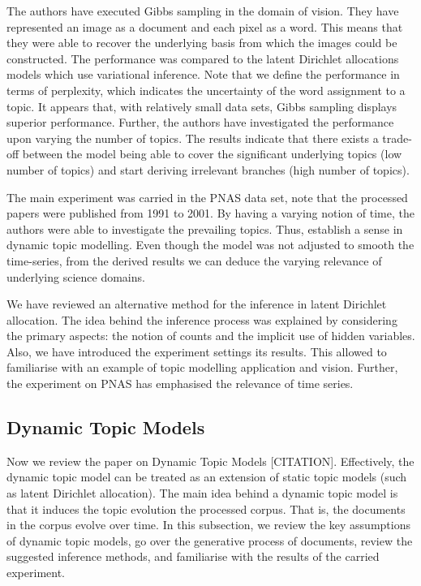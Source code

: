 \documentclass{mprop}
\begin{document}
\par The authors have executed Gibbs sampling in the domain of vision. They have represented an image as a document and each pixel as a word. This means that they were able to recover the underlying basis from which the images could be constructed. The performance was compared to the latent Dirichlet allocations models which use variational inference. Note that we define the performance in terms of perplexity, which indicates the uncertainty of the word assignment to a topic. It appears that, with relatively small data sets, Gibbs sampling displays superior performance. Further, the authors have investigated the performance upon varying the number of topics. The results indicate that there exists a trade-off between the model being able to cover the significant underlying topics (low number of topics) and start deriving irrelevant branches (high number of topics).

\par The main experiment was carried in the PNAS data set, note that the processed papers were published from 1991 to 2001. By having a varying notion of time, the authors were able to investigate the prevailing topics. Thus, establish a sense in dynamic topic modelling. Even though the model was not adjusted to smooth the time-series, from the derived results we can deduce the varying relevance of underlying science domains.  

\par We have reviewed an alternative method for the inference in latent Dirichlet allocation. The idea behind the inference process was explained by considering the primary aspects: the notion of counts and the implicit use of hidden variables. Also, we have introduced the experiment settings its results. This allowed to familiarise with an example of topic modelling application and vision. Further, the experiment on PNAS has emphasised the relevance of time series.

\subsection{Dynamic Topic Models}

\par Now we review the paper on Dynamic Topic Models [CITATION]. Effectively, the dynamic topic model can be treated as an extension of static topic models (such as latent Dirichlet allocation). The main idea behind a dynamic topic model is that it induces the topic evolution the processed corpus. That is, the documents in the corpus evolve over time. In this subsection, we review the key assumptions of dynamic topic models, go over the generative process of documents, review the suggested inference methods, and familiarise with the results of the carried experiment. 
\end{document}
